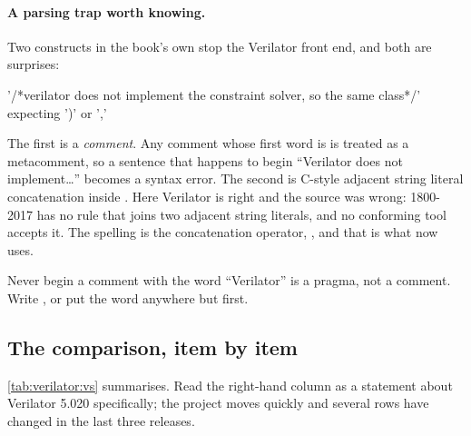 \paragraph{A parsing trap worth knowing.} Two constructs in the book's own
 stop the Verilator front end, and both are surprises:

\begin{txtcode}
        '/*verilator does not implement the constraint solver, so the same
        class*/'
        expecting ')' or ','
\end{txtcode}

The first is a \emph{comment}. Any comment whose first word is
 is treated as a metacomment, so a sentence that happens to
begin ``Verilator does not implement\ldots'' becomes a syntax error. The second
is C-style adjacent string literal concatenation inside .
Here Verilator is right and the source was wrong: 1800-2017 has no rule that
joins two adjacent string literals, and no conforming tool accepts it. The
\SV{} spelling is the concatenation operator, , and that is
what  now uses.

\begin{gotcha}{Never begin a comment with the word ``Verilator''}
 is a pragma, not a comment. Write
, or put the word anywhere but first.
\end{gotcha}

\subsection{The comparison, item by item}
\label{sec:verilator:table}

\cref{tab:verilator:vs} summarises. Read the right-hand column as a statement
about Verilator 5.020 specifically; the project moves quickly and several rows
have changed in the last three releases.

